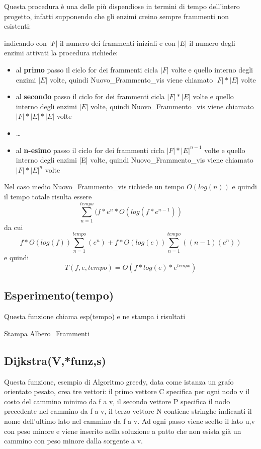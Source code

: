 \documentclass[a4paper,10pt]{article}
\newcommand{\grass}[1]{\textbf{#1}}
\begin{document}
Questa procedura è una delle più dispendiose in termini di tempo dell'intero progetto, infatti supponendo che gli enzimi creino sempre frammenti non esistenti:

indicando con $|F|$ il numero dei frammenti iniziali e con $|E|$ il numero degli enzimi attivati la procedura richiede:
\begin{itemize}
\item al \grass{primo} passo il ciclo for dei frammenti cicla $|F|$ volte e quello interno degli enzimi $|E|$ volte, quindi Nuovo\_{}Frammento\_{}vis viene chiamato $|F|*|E|$ volte
\item al \grass{secondo} passo il ciclo for dei frammenti cicla $|F|*|E|$ volte e quello interno degli enzimi $|E|$ volte, quindi Nuovo\_{}Frammento\_{}vis viene chiamato $|F|*|E|*|E|$ volte
\item \dots
\item al \grass{n-esimo} passo il ciclo for dei frammenti cicla $|F|*|E|^{n-1}$ volte e quello interno degli enzimi |E| volte, quindi Nuovo\_{}Frammento\_{}vis viene chiamato $|F|*|E|^n$ volte
\end{itemize}
Nel caso medio Nuovo\_{}Frammento\_{}vis richiede un tempo $O(log(n))$ e quindi il tempo totale risulta essere \begin{displaymath}\sum_{n=1}^{tempo}{(f*e^n*O(log(f*e^{n-1}))}
\end{displaymath}
da cui \begin{displaymath}
f*O(log(f))\sum_{n=1}^{tempo}{(e^n)} + f*O(log(e))\sum_{n=1}^{tempo}{((n-1)(e^n))}
\end{displaymath}
e quindi \begin{displaymath}
T(f,e,tempo) = O(f*log(e)*e^{tempo})
\end{displaymath}

\subsection{Esperimento(tempo)}
Questa funzione chiama esp(tempo) e ne stampa i risultati

\begin{algorithm}[H]
Stampa Albero\_{}Frammenti\;
\end{algorithm}
\newpage\subsection{Dijkstra(V,*funz,s)}
Questa funzione, esempio di Algoritmo greedy, data come istanza un grafo orientato pesato, crea tre vettori: il primo vettore C specifica per ogni nodo v il costo del cammino minimo da f a v, il secondo vettore P specifica il nodo precedente nel cammino da f a v, il terzo vettore N contiene stringhe indicanti il nome dell'ultimo lato nel cammino da f a v. Ad ogni passo viene scelto il lato {u,v} con peso minore e viene inserito nella soluzione a patto che non esista già un cammino con peso minore dalla sorgente a v.
\end{document}

